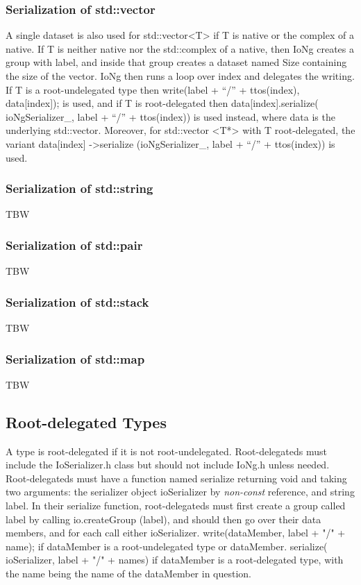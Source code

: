 \documentclass{article}
\newcommand{\code}[1]{{\ttfamily #1}}
\begin{document}
\subsubsection{Serialization of std::vector}
A single dataset is also used for \code{std::vector<T>} 
if \code{T} is native or the complex of a native.
If T is neither native nor the std::complex of a native, then \code{IoNg} creates a group with 
\code{label}, and inside that group
creates a dataset named \code{Size} containing the size of the vector.
\code{IoNg} then runs a loop over \code{index} and delegates the writing. 
If \code{T} is a root-undelegated type then
\code{write(label + ``/''} \code{ + ttos(index),} \code{ data[index]);} is used,
and if \code{T} is root-delegated
then
\code{data[index].serialize(} \code{ioNgSerializer\_,} \code{ label + ``/''}
\code{ + ttos(index))}  is used instead,
where \code{data} is the underlying \code{std::vector}.
Moreover, for  \code{std::vector} \code{<T*>} with T root-delegated, the variant
\code{data[index]} \code{->serialize} \code{(ioNgSerializer\_, } \code{label +}
\code{``/'' + ttos(index))} is used.
	
\subsubsection{Serialization of std::string}
TBW

\subsubsection{Serialization of std::pair}
TBW

\subsubsection{Serialization of std::stack}
TBW

\subsubsection{Serialization of std::map}
TBW

\subsection{Root-delegated Types}
A type is root-delegated if it is not root-undelegated.
Root-delegateds must include the \code{IoSerializer.h} class
but should not include \code{IoNg.h} unless needed. 
Root-delegateds must have a function named \code{serialize} returning \code{void}
and taking two arguments: the serializer object \code{ioSerializer}
by \emph{non-const} reference, and string \code{label}.
In their \code{serialize} function, root-delegateds must first create a group called label by calling
\code{io.createGroup} \code{(label),} and
should then go over their data members, and for each call either
\code{ioSerializer.} \code{write(dataMember,} \code{label +} \code{"/" + name);}
if \code{dataMember} is a root-undelegated type or
\code{dataMember.} \code{serialize(} \code{ioSerializer, } \code{label +} \code{"/" + names)}
if \code{dataMember} is a root-delegated type,
with the name being the name of the \code{dataMember} in question.
\end{document}
